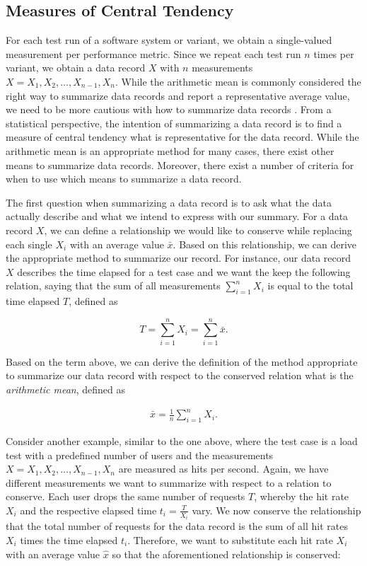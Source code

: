 \subsection{Measures of Central Tendency}
For each test run of a software system or variant, we obtain a single-valued
measurement per performance metric. Since we repeat each test run $n$ times
per variant, we obtain a data record $X$ with $n$ measurements $X = X_1, X_2,
\ldots, X_{n-1}, X_n$. While the arithmetic mean is commonly considered the
right way to summarize data records and report a representative average
value, we need to be more cautious with how to summarize data records
\citep{fleming_how_1986,smith_characterizing_1988}. From a statistical
perspective, the intention of summarizing a data record is to find a measure of
central tendency what is representative for the data record.
While the arithmetic mean is an appropriate method for many cases, there exist
other means to summarize data records. Moreover, there exist a number of
criteria for when to use which means to summarize a data record. 

The first question when summarizing a data
record is to ask what the data actually describe and what we intend to express
with our summary. For a data record $X$, we can define a
relationship we would like to conserve while replacing each single $X_i$ with an
average value $\bar{x}$. Based on this relationship, we can derive the
appropriate method to summarize our record. For instance, our data record $X$
describes the time elapsed for a test case and we want the keep the following
relation, saying that the sum of all measurements $\sum_{i = 1}^{n} X_i$ is
equal to the total time elapsed $T$, defined as

$$
T = \sum_{i = 1}^{n} X_i = \sum_{i = 1}^{n} \bar{x}.
$$

Based on the term above, we can derive the definition of the method
appropriate to summarize our data record with respect to the conserved relation
what is the \emph{arithmetic mean}, defined as

\begin{equation} \label{eq:arithmetic_mean}
\begin{split}
\bar{x} = \frac{1}{n} \sum_{i = 1}^{n} X_i.
\end{split}
\end{equation}

Consider another example, similar to the one above, where the test
case is a load test with a predefined number of users and the measurements $X =
X_1, X_2, \ldots, X_{n-1}, X_n$ are
measured as hits per second. Again, we have different measurements we want to
summarize with respect to a relation to conserve. Each user drops the same
number of requests $T$, whereby the hit rate $X_i$ and the respective elapsed
time $t_i = \frac{T}{X_i }$ vary. We now conserve the relationship that the
total number of requests for the data record is the sum of all hit rates $X_i$
times the time elapsed $t_i$. Therefore, we want to substitute each hit rate
$X_i$ with an average value $\hat{x}$ so that the aforementioned relationship is
conserved:

